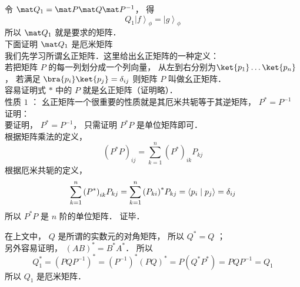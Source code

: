 令 ${\mat Q_1} = \mat P\mat Q{\mat P^{ - 1}}$，  得
\begin{equation}
  {Q_1}{\left| f \right\rangle_\phi } = {\left| g \right\rangle_\phi }
\end{equation}
所以 ${\mat Q_1}$ 就是要求的矩阵．\\
下面证明 ${\mat Q_1}$ 是厄米矩阵\\
我们先学习所谓幺正矩阵．这里给出幺正矩阵的一种定义：\\
若把矩阵 $P$ 的每一列划分成一个列向量， 从左到右分别为$\ket{p_1} \dots\ket{p_n}$，  若满足 $\bra{p_i}\ket{p_j}=\delta_{ij}$ 则矩阵 $P$ 叫做幺正矩阵．\\
容易证明式 $*$ 中的 $P$ 就是幺正矩阵（证明略）．\\
性质 $1$ ： 幺正矩阵一个很重要的性质就是其厄米共轭等于其逆矩阵， ${P^*} = {P^{ - 1}}$ \\
证明：\\
要证明， ${P^*} = {P^{ - 1}}$，  只需证明 ${P^*}P$ 是单位矩阵即可．\\
根据矩阵乘法的定义，
\begin{equation}
{\left( {{P^*}P} \right)_{ij}} = \sum\limits_{k = 1}^n {{{\left( {{P^*}} \right)}_{ik}}{P_{kj}}}
\end{equation}
根据厄米共轭的定义，
\begin{equation}
 \sum\limits_{k = 1}^n {{{\left( {{P^*}} \right)}_{ik}}{P_{kj}}}  = \sum\limits_{k = 1}^n {{{\left( {{P_{ki}}} \right)}^*}{P_{kj}}}  = \left\langle {{{p_i}}}
 \mathrel{\left | {\vphantom {{{p_i}} {{p_j}}}}
 \right. \kern-\nulldelimiterspace}
 {{{p_j}}} \right\rangle  = {\delta_{ij}}
\end{equation}
所以 ${P^*}P$ 是 $n$ 阶的单位矩阵．  证毕．

在上文中， $Q$ 是所谓的实数元的对角矩阵， 所以 ${Q^*} = Q$ ；\\
另外容易证明， ${\left( {AB} \right)^*} = {B^*}{A^*}$．  所以
\begin{equation}
Q_1^* = {\left( {PQ{P^{ - 1}}} \right)^*} = {\left( {{P^{ - 1}}} \right)^*}{\left( {PQ} \right)^*} = P\left( {{Q^*}{P^*}} \right) = PQ{P^{ - 1}} = {Q_1}
\end{equation}
所以 ${Q_1}$ 是厄米矩阵．

